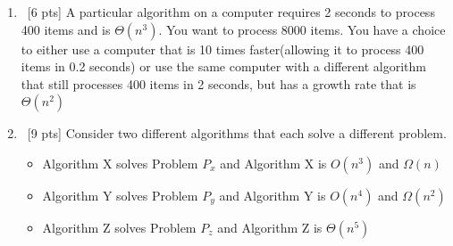 \documentclass[12pt]{article}
\newenvironment{sol}[1][Solution]{\begin{trivlist}\item[\hskip\labelsep {\bfseries #1:}]}{\end{trivlist}}
\begin{document}
\begin{enumerate}
    \item \ [6 pts] A particular algorithm on a computer requires 2 seconds to process 400 items and is $\Theta(n^3)$. You want to process $8000$ items. You have a choice to either use a computer that is 10 times faster(allowing it to process 400 items in 0.2 seconds) or use the same computer with a different algorithm that still processes 400 items in 2 seconds, but has a growth rate that is $\Theta(n^2)$

    \item \ [9 pts] Consider two different algorithms that each solve a different problem.
    \begin{itemize}
        \item Algorithm X solves Problem $P_x$ and Algorithm X is $O(n^3)$ and $\Omega(n)$
        \item Algorithm Y solves Problem $P_y$ and Algorithm Y is $O(n^4)$ and $\Omega(n^2)$
        \item Algorithm Z solves Problem $P_z$ and Algorithm Z is $\Theta(n^5)$


\end{itemize}
\end{enumerate}
\end{document}
